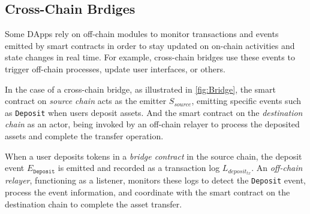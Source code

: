 \subsection{Cross-Chain Brdiges}
Some DApps rely on off-chain modules to monitor transactions and events emitted by smart contracts in order to stay updated on on-chain activities and state changes in real time. For example, cross-chain bridges use these events to trigger off-chain processes, update user interfaces, or others.

In the case of a cross-chain bridge, as illustrated in \cref{fig:Bridge}, the smart contract on \emph{source chain} acts as the emitter $S_{source}$, emitting specific events such as \texttt{Deposit} when users deposit assets. And the smart contract on the \emph{destination chain} as an actor, being invoked by an off-chain relayer to process the deposited assets and complete the transfer operation.

When a user deposits tokens in a \emph{bridge contract} in the source chain, the deposit event $E_{\texttt{Deposit}}$ is emitted and recorded as a transaction log $L_{deposit_{tx}}$. An \emph{off-chain relayer}, functioning as a listener, monitors these logs to detect the \texttt{Deposit} event, process the event information, and coordinate with the smart contract on the destination chain to complete the asset transfer.